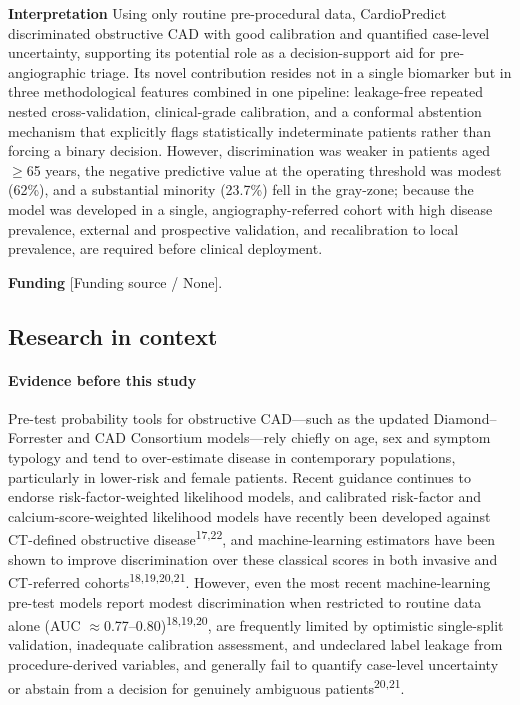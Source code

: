 \documentclass[
  english,
  11pt,
]{article}
\begin{document}
\textbf{Interpretation} Using only routine pre-procedural data,
CardioPredict discriminated obstructive CAD with good calibration and
quantified case-level uncertainty, supporting its potential role as a
decision-support aid for pre-angiographic triage. Its novel contribution
resides not in a single biomarker but in three methodological features
combined in one pipeline: leakage-free repeated nested cross-validation,
clinical-grade calibration, and a conformal abstention mechanism that
explicitly flags statistically indeterminate patients rather than forcing
a binary decision. However, discrimination was weaker in patients aged
\(\ge\)65 years, the negative predictive value at the operating threshold was
modest (62\%), and a substantial minority (23.7\%) fell in the gray-zone;
because the model was developed in a single, angiography-referred cohort
with high disease prevalence, external and prospective validation, and
recalibration to local prevalence, are required before clinical
deployment.

\textbf{Funding} {[}Funding source / None{]}.

\subsection{Research in context}\label{research-in-context}

\paragraph{Evidence before this study}\label{evidence-before-this-study}

Pre-test probability tools for obstructive CAD---such as the updated
Diamond--Forrester and CAD Consortium models---rely chiefly on age, sex
and symptom typology and tend to over-estimate disease in contemporary
populations, particularly in lower-risk and female patients. Recent guidance
continues to endorse risk-factor-weighted likelihood models, and
calibrated risk-factor and calcium-score-weighted likelihood models have
recently been developed against CT-defined obstructive disease\textsuperscript{17,22}, and
machine-learning estimators have been shown to improve discrimination over
these classical scores in both invasive and CT-referred cohorts\textsuperscript{18,19,20,21}.
However, even the most recent machine-learning pre-test models report
modest discrimination when restricted to routine data alone (AUC
\(\approx\)0.77--0.80)\textsuperscript{18,19,20}, are frequently limited by
optimistic single-split validation, inadequate calibration assessment, and
undeclared label leakage from procedure-derived variables, and generally
fail to quantify case-level uncertainty or abstain from a decision for
genuinely ambiguous patients\textsuperscript{20,21}.
\end{document}
